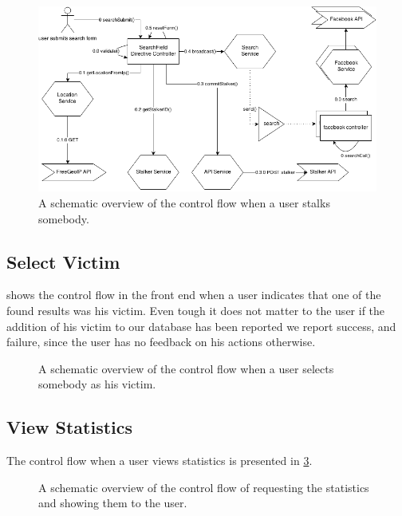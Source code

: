 		\begin{figure}
			\includegraphics[width=\textwidth]{./img/1_stalking_flow}
			\caption{A schematic overview of the control flow when a user stalks somebody.}
			\label{fig:1:controlflowStalk}
		\end{figure}	

\subsection{Select Victim}
	 shows the control flow in the front end when a user indicates that one of the found results was his victim. Even tough it does not matter to the user if the addition of his victim to our database has been reported we report success, and failure, since the user has no feedback on his actions otherwise. 

		\begin{figure}
			\caption{A schematic overview of the control flow when a user selects somebody as his victim.}
			\label{fig:1:controlflowVictim}
		\end{figure}		

\subsection{View Statistics}
	The control flow when a user views statistics is presented in \cref{fig:1:controlflowStat}.


	\begin{figure}
		\caption{A schematic overview of the control flow of requesting the statistics and showing them to the user.}
		\label{fig:1:controlflowStat}
	\end{figure}